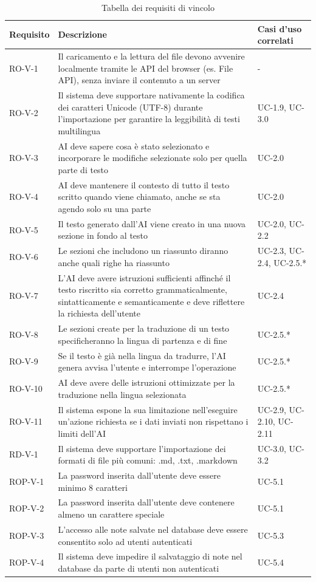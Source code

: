 \documentclass[11pt,a4paper]{article}
\begin{document}
\begin{table}[H]
\centering
\begin{tabular}{|p{}|>{\raggedright\arraybackslash}p{}|p{}|}
\hline
\textbf{Requisito} & \textbf{Descrizione} & \textbf{Casi d'uso correlati}\\
\hline
RO-V-1 & Il caricamento e la lettura del file devono avvenire localmente tramite le API del browser (es. File API), senza inviare il contenuto a un server & - \\
\hline
RO-V-2 & Il sistema deve supportare nativamente la codifica dei caratteri Unicode (UTF-8) durante l'importazione per garantire la leggibilità di testi multilingua & UC-1.9, UC-3.0 \\
\hline
RO-V-3 & AI deve sapere cosa è stato selezionato e incorporare le modifiche selezionate solo per quella parte di testo & UC-2.0 \\
\hline
RO-V-4 & AI deve mantenere il contesto di tutto il testo scritto quando viene chiamato, anche se sta agendo solo su una parte & UC-2.0 \\
\hline
RO-V-5 & Il testo generato dall'AI viene creato in una nuova sezione in fondo al testo & UC-2.0, UC-2.2 \\
\hline
RO-V-6 & Le sezioni che includono un riassunto diranno anche quali righe ha riassunto & UC-2.3, UC-2.4, UC-2.5.* \\
\hline
RO-V-7 & L'AI deve avere istruzioni sufficienti affinché il testo riscritto sia corretto grammaticalmente, sintatticamente e semanticamente e deve riflettere la richiesta dell'utente & UC-2.4 \\
\hline
RO-V-8 & Le sezioni create per la traduzione di un testo specificheranno la lingua di partenza e di fine & UC-2.5.* \\
\hline
RO-V-9 & Se il testo è già nella lingua da tradurre, l'AI genera avvisa l'utente e interrompe l'operazione & UC-2.5.* \\
\hline
RO-V-10 & AI deve avere delle istruzioni ottimizzate per la traduzione nella lingua selezionata & UC-2.5.* \\
\hline
RO-V-11 & Il sistema espone la sua limitazione nell'eseguire un'azione richiesta se i dati inviati non rispettano i limiti dell'AI & UC-2.9, UC-2.10, UC-2.11 \\
\hline
RD-V-1 & Il sistema deve supportare l'importazione dei formati di file più comuni: .md, .txt, .markdown & UC-3.0, UC-3.2 \\
\hline
ROP-V-1 & La password inserita dall'utente deve essere minimo 8 caratteri & UC-5.1 \\
\hline
ROP-V-2 & La password inserita dall'utente deve contenere almeno un carattere speciale & UC-5.1 \\
\hline
ROP-V-3 & L'accesso alle note salvate nel database deve essere consentito solo ad utenti autenticati & UC-5.3 \\
\hline
ROP-V-4 & Il sistema deve impedire il salvataggio di note nel database da parte di utenti non autenticati & UC-5.4 \\
\hline
\end{tabular}
\caption{Tabella dei requisiti di vincolo}
\end{table}
\end{document}

